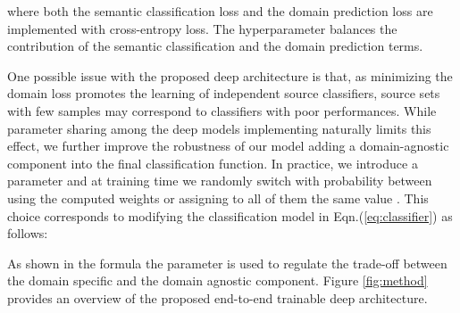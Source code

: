\documentclass{article}
\begin{document}
where both the semantic classification loss  and the domain prediction loss  are implemented with cross-entropy loss. The hyperparameter  balances the contribution of the semantic classification and the domain prediction terms.
 
 





One possible issue with the proposed deep architecture is that, as minimizing the domain loss promotes the learning of independent source classifiers, source sets with few samples may correspond to classifiers with poor performances. While parameter sharing among the deep models implementing  naturally limits this effect, we further improve the robustness of our model adding a domain-agnostic component into the final classification function. In practice, we introduce a parameter  and at training time we randomly switch with probability  between using the computed weights  or assigning to all of them the same value . This choice corresponds to modifying the classification model in Eqn.(\ref{eq:classifier}) as follows:
\vspace{-0.1cm}
 
As shown in the formula the parameter  is used to regulate the trade-off between the domain specific and the domain agnostic component. Figure \ref{fig:method} provides an overview of the proposed end-to-end trainable deep architecture.

















 

 

 
\end{document}
